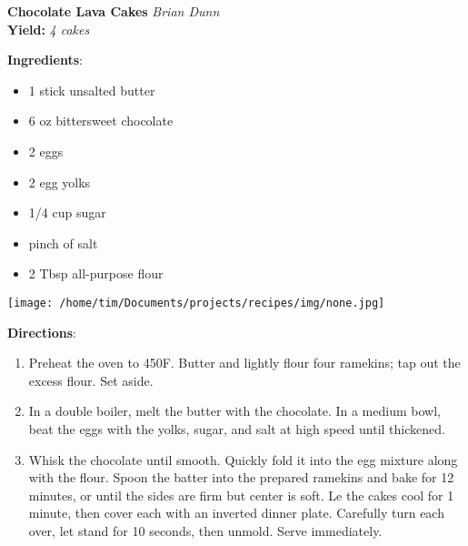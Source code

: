 \documentclass[11pt, twoside, openany]{book}
\begin{document}
\noindent\begin{minipage}[t]{\linewidth}%
{\Large\textbf{Chocolate Lava Cakes}} \label{chocolate-lava-cakes}\hfill\textit{Brian Dunn}\\
\textbf{Yield:} \textit{4 cakes}\\
\noindent\begin{minipage}[t]{0.78\linewidth}%
\textbf{Ingredients}:\vspace{-3mm}
\begin{multicols}{2}
\begin{itemize}\setlength\itemsep{-1mm}
\item 1 stick unsalted butter
\item 6 oz bittersweet chocolate
\item 2 eggs
\item 2 egg yolks
\item 1/4 cup sugar
\item pinch of salt
\item 2 Tbsp all-purpose flour
\end{itemize}
\end{multicols}
\end{minipage}
\noindent\begin{minipage}[t]{0.18\linewidth}
\centering \strut\vspace*{-\baselineskip}\newline
\texttt{[image: /home/tim/Documents/projects/recipes/img/none.jpg]}\\
\end{minipage}\vspace{3mm}
\textbf{Directions}:
\vspace{-3mm}\begin{enumerate}\setlength\itemsep{-1mm}
\item Preheat the oven to 450F. Butter and lightly flour four ramekins; tap out the excess flour. Set aside.
\item In a double boiler, melt the butter with the chocolate. In a medium bowl, beat the eggs with the yolks, sugar, and salt at high speed until thickened.
\item Whisk the chocolate until smooth. Quickly fold it into the egg mixture along with the flour. Spoon the batter into the prepared ramekins and bake for 12 minutes, or until the sides are firm but center is soft. Le the cakes cool for 1 minute, then cover each with an inverted dinner plate. Carefully turn each over, let stand for 10 seconds, then unmold. Serve immediately.
\end{enumerate}
\end{minipage}\vspace{8mm}
\end{document}
